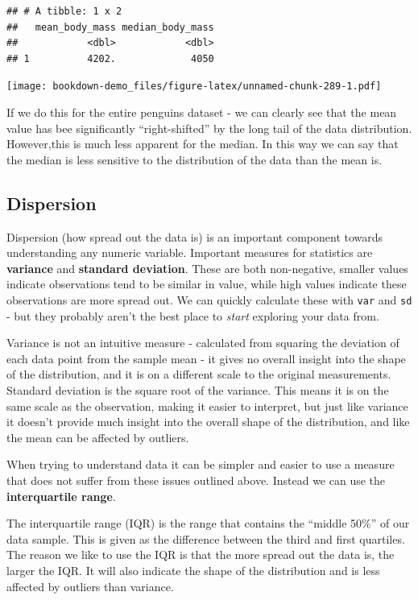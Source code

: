 \documentclass[
]{book}
\begin{document}
\begin{verbatim}
## # A tibble: 1 x 2
##   mean_body_mass median_body_mass
##            <dbl>            <dbl>
## 1          4202.             4050
\end{verbatim}

\texttt{[image: bookdown-demo\_files/figure-latex/unnamed-chunk-289-1.pdf]}

If we do this for the entire penguins dataset - we can clearly see that the mean value has bee significantly ``right-shifted'' by the long tail of the data distribution. However,this is much less apparent for the median. In this way we can say that the median is less sensitive to the distribution of the data than the mean is.

\hypertarget{dispersion}{%
\subsection{Dispersion}\label{dispersion}}

Dispersion (how spread out the data is) is an important component towards understanding any numeric variable. Important measures for statistics are \textbf{variance} and \textbf{standard deviation}. These are both non-negative, smaller values indicate observations tend to be similar in value, while high values indicate these observations are more spread out. We can quickly calculate these with \texttt{var} and \texttt{sd} - but they probably aren't the best place to \emph{start} exploring your data from.

Variance is not an intuitive measure - calculated from squaring the deviation of each data point from the sample mean - it gives no overall insight into the shape of the distribution, and it is on a different scale to the original measurements. Standard deviation is the square root of the variance. This means it is on the same scale as the observation, making it easier to interpret, but just like variance it doesn't provide much insight into the overall shape of the distribution, and like the mean can be affected by outliers.

When trying to understand data it can be simpler and easier to use a measure that does not suffer from these issues outlined above. Instead we can use the \textbf{interquartile range}.

The interquartile range (IQR) is the range that contains the ``middle 50\%'' of our data sample. This is given as the difference between the third and first quartiles. The reason we like to use the IQR is that the more spread out the data is, the larger the IQR. It will also indicate the shape of the distribution and is less affected by outliers than variance.
\end{document}
